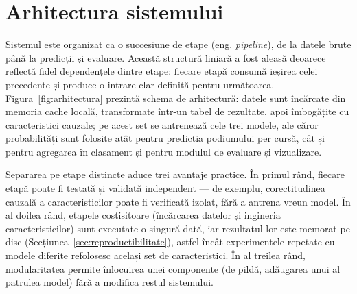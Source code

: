 \documentclass[12pt,a4paper]{report}
\begin{document}
\section{Arhitectura sistemului}
\label{sec:arhitectura}

Sistemul este organizat ca o succesiune de etape (eng. \emph{pipeline}), de la datele brute până
la predicții și evaluare. Această structură liniară a fost aleasă deoarece reflectă fidel
dependențele dintre etape: fiecare etapă consumă ieșirea celei precedente și produce o intrare
clar definită pentru următoarea. Figura~\ref{fig:arhitectura} prezintă schema de arhitectură:
datele sunt încărcate din memoria cache locală, transformate într-un tabel de rezultate, apoi
îmbogățite cu caracteristici cauzale; pe acest set se antrenează cele trei modele, ale căror
probabilități sunt folosite atât pentru predicția podiumului per cursă, cât și pentru agregarea
în clasament și pentru modulul de evaluare și vizualizare.

Separarea pe etape distincte aduce trei avantaje practice. În primul rând, fiecare etapă poate fi
testată și validată independent --- de exemplu, corectitudinea cauzală a caracteristicilor poate
fi verificată izolat, fără a antrena vreun model. În al doilea rând, etapele costisitoare
(încărcarea datelor și ingineria caracteristicilor) sunt executate o singură dată, iar rezultatul
lor este memorat pe disc (Secțiunea~\ref{sec:reproductibilitate}), astfel încât experimentele
repetate cu modele diferite refolosesc același set de caracteristici. În al treilea rând,
modularitatea permite înlocuirea unei componente (de pildă, adăugarea unui al patrulea model)
fără a modifica restul sistemului.
\end{document}
